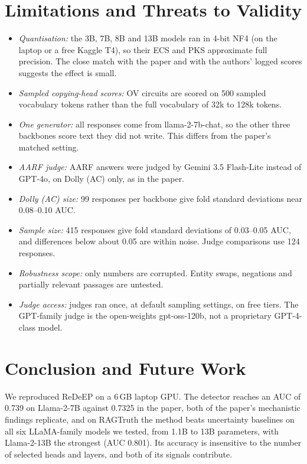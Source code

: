 \documentclass[conference]{IEEEtran}
\begin{document}
\section{Limitations and Threats to Validity}
\begin{itemize}
\item \emph{Quantisation:} the 3B, 7B, 8B and 13B models ran in 4-bit NF4 (on the laptop or a free Kaggle T4), so their ECS and PKS approximate full precision. The close match with the paper and with the authors' logged scores suggests the effect is small.
\item \emph{Sampled copying-head scores:} OV circuits are scored on 500 sampled vocabulary tokens rather than the full vocabulary of 32k to 128k tokens.
\item \emph{One generator:} all responses come from llama-2-7b-chat, so the other three backbones score text they did not write. This differs from the paper's matched setting.
\item \emph{AARF judge:} AARF answers were judged by Gemini 3.5 Flash-Lite instead of GPT-4o, on Dolly (AC) only, as in the paper.
\item \emph{Dolly (AC) size:} 99 responses per backbone give fold standard deviations near 0.08--0.10 AUC.
\item \emph{Sample size:} 415 responses give fold standard deviations of 0.03--0.05 AUC, and differences below about 0.05 are within noise. Judge comparisons use 124 responses.
\item \emph{Robustness scope:} only numbers are corrupted. Entity swaps, negations and partially relevant passages are untested.
\item \emph{Judge access:} judges ran once, at default sampling settings, on free tiers. The GPT-family judge is the open-weights gpt-oss-120b, not a proprietary GPT-4-class model.
\end{itemize}

\section{Conclusion and Future Work}
We reproduced ReDeEP on a 6\,GB laptop GPU. The detector reaches an AUC of 0.739 on Llama-2-7B against 0.7325 in the paper, both of the paper's mechanistic findings replicate, and on RAGTruth the method beats uncertainty baselines on all six LLaMA-family models we tested, from 1.1B to 13B parameters, with Llama-2-13B the strongest (AUC 0.801). Its accuracy is insensitive to the number of selected heads and layers, and both of its signals contribute.
\end{document}
